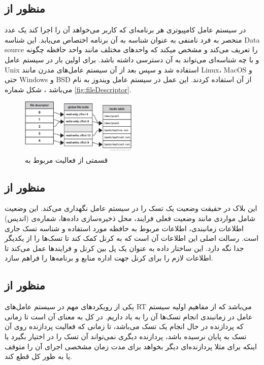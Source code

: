 \documentclass[10pt, a4paper]{article}
\begin{document}
\subsection{منظور از }

در سیستم عامل کامپیوتری هر برنامه‌ای که کاربر می‌خواهد آن را اجرا کند یک عدد
منحصر به فرد نامنفی به عنوان شناسه به آن برنامه اختصاص می‌یابد. این شناسه Data
source را تعریف می‌کند و مشخص میکند که واحد‌های مختلف مانند واحد حافظه چگونه و
با چه شناسه‌ای می‌تواند به آن دسترسی داشته باشد.  برای اولین
بار در سیستم عامل Unix استفاده شد و سپس بعد از آن سیستم عامل‌های مدرن مانند
Linux، MacOS و حتی Windows و BSD از آن استفاده کردند. این عمل در سیستم عامل
ویندوز به نام  می‌باشد \cite{filedescriptor}، شکل شماره
\ref{fig:fileDescriptor}.

\begin{figure}
    \centering
    \includegraphics[width=0.5\textwidth]{figs/file_descriptor.png}
    \caption{قسمتی از فعالیت مربوط به }
    \label{fig:filedescriptor}
\end{figure}

\subsection{منظور از }

این بلاک در حقیقت وضعیت یک تسک را در سیستم عامل نگهداری می‌کند. این وضعیت شامل
مواردی مانند وضعیت فعلی فرایند، محل ذخیره‌سازی داده‌ها، شماره‌ی (اندیس) اطلاعات
زمانبندی، اطلاعات مربوط به حافظه مورد استفاده و شناسه تسک جاری است. رسالت اصلی
این اطلاعات آن است که به کرنل کمک کند تا تسک‌ها را از یکدیگر جدا نگه دارد. این
ساختار داده به عنوان یک پل بین کرنل و فرایند‌ها عمل می‌کند تا اطلاعات لازم را
برای کرنل جهت اداره منابع و برنامه‌ها را فراهم سازد.

\subsection{منظور از }

یکی از رویکرد‌های مهم در سیستم عامل‌های RT می‌باشد که از مفاهیم اولیه سیستم عامل
در زمانبندی انجام تسک‌ها آن را به یاد داریم. در کل به معنای آن است تا زمانی که
پردازنده در حال انجام یک تسک می‌باشد، تا زمانی که فعالیت پردازنده روی آن تسک به
پایان نرسیده باشد، پردازنده دیگری نمی‌تواند آن تسک را در اختیار بگیرد یا اینکه
برای مثلا پردازنده‌ای دیگر بخواهد برای مدت زمان مشخصی اجرای آن را متوقف یا به
طور کل قطع کند.
\end{document}

